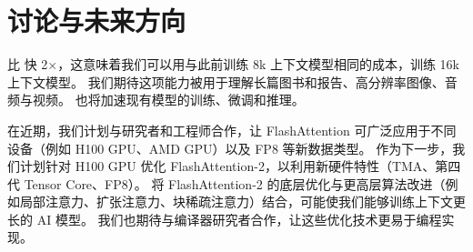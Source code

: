 \section{讨论与未来方向}
\label{sec:discussion}


\sysname 比 \sysnameone 快 2$\times$，这意味着我们可以用与此前训练 8k 上下文模型相同的成本，训练 16k 上下文模型。
我们期待这项能力被用于理解长篇图书和报告、高分辨率图像、音频与视频。
\sysname 也将加速现有模型的训练、微调和推理。

在近期，我们计划与研究者和工程师合作，让 FlashAttention 可广泛应用于不同设备（例如 H100 GPU、AMD GPU）以及 FP8 等新数据类型。
作为下一步，我们计划针对 H100 GPU 优化 FlashAttention-2，以利用新硬件特性（TMA、第四代 Tensor Core、FP8）。
将 FlashAttention-2 的底层优化与更高层算法改进（例如局部注意力、扩张注意力、块稀疏注意力）结合，可能使我们能够训练上下文更长的 AI 模型。
我们也期待与编译器研究者合作，让这些优化技术更易于编程实现。



